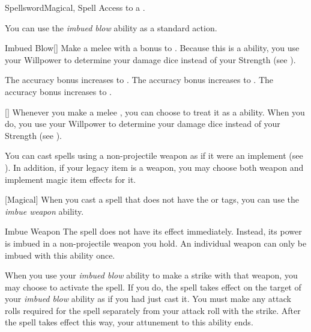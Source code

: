     \begin{feat}{Spellsword}{Magical, Spell}
        \featpre Access to a .

         You can use the \textit{imbued blow} ability as a standard action.
        \begin{activeability}{Imbued Blow}[]
            \rankline
            Make a melee  with a  bonus to .
            Because this is a  ability, you use your Willpower to determine your damage dice instead of your Strength (see ).

            \rankline
             The accuracy bonus increases to .
             The accuracy bonus increases to .
             The accuracy bonus increases to .
        \end{activeability}

        [] Whenever you make a melee , you can choose to treat it as a  ability.
        When you do, you use your Willpower to determine your damage dice instead of your Strength (see ).

         You can cast spells using a non-projectile weapon as if it were an implement (see ).
        In addition, if your legacy item is a weapon, you may choose both weapon and implement magic item effects for it.

        [Magical] When you cast a spell that does not have the  or  tags,
            you can use the \textit{imbue weapon} ability.
        \begin{attuneability}{Imbue Weapon}{}
            \rankline
            The spell does not have its effect immediately.
            Instead, its power is imbued in a non-projectile weapon you hold.
            An individual weapon can only be imbued with this ability once.

            When you use your \textit{imbued blow} ability to make a strike with that weapon, you may choose to activate the spell.
            If you do, the spell takes effect on the target of your \textit{imbued blow} ability as if you had just cast it.
            You must make any attack rolls required for the spell separately from your attack roll with the strike.
            After the spell takes effect this way, your attunement to this ability ends.
        \end{attuneability}


\end{feat}
